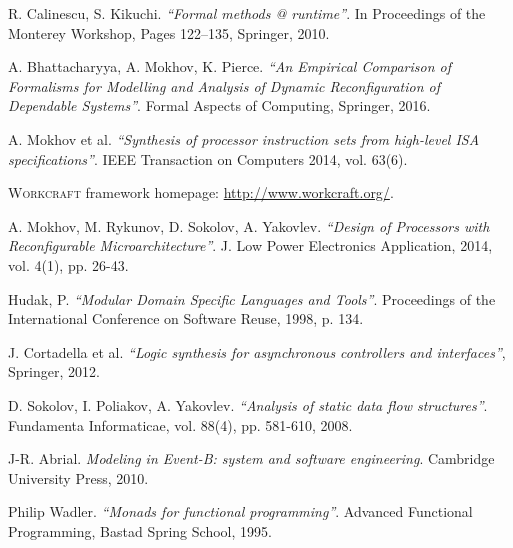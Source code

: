 \documentclass[conference]{IEEEtran}
\begin{document}
\begin{thebibliography}{12}
\vspace{-1mm}

R. Calinescu, S. Kikuchi. \emph{``Formal methods @ runtime''}. In Proceedings of the Monterey Workshop, Pages 122–135, Springer, 2010.

A. Bhattacharyya, A. Mokhov, K. Pierce. \emph{``An Empirical Comparison of Formalisms for Modelling and Analysis of Dynamic Reconfiguration of Dependable Systems''}. Formal Aspects of Computing, Springer, 2016.

A. Mokhov et al.
\emph{``Synthesis of processor instruction sets from high-level ISA specifications''}. IEEE Transaction on Computers 2014, vol. 63(6).

    \textsc{Workcraft} framework homepage: \url{http://www.workcraft.org/}.

  A. Mokhov, M. Rykunov, D. Sokolov, A. Yakovlev.
  \emph{``Design of Processors with Reconfigurable Microarchitecture''}.
  J. Low Power Electronics Application, 2014, vol. 4(1), pp. 26-43.

  Hudak, P.
  \emph{``Modular Domain Specific Languages and Tools''}.
  Proceedings of the International Conference on Software Reuse, 1998, p. 134.

J. Cortadella et al. \emph{``Logic synthesis for asynchronous controllers and interfaces''}, Springer, 2012.

  D. Sokolov, I. Poliakov, A. Yakovlev. \emph{``Analysis of static data flow structures''}. Fundamenta Informaticae, vol. 88(4), pp. 581-610, 2008.

  J-R. Abrial. \emph{Modeling in Event-B: system and software engineering}. Cambridge University Press, 2010.

  Philip Wadler.
  \emph{``Monads for functional programming''}.
  Advanced Functional Programming, Bastad Spring School, 1995.




\end{thebibliography}
\end{document}
